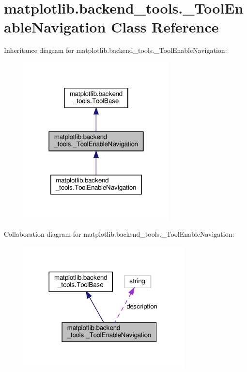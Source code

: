 \hypertarget{classmatplotlib_1_1backend__tools_1_1__ToolEnableNavigation}{}\section{matplotlib.\+backend\+\_\+tools.\+\_\+\+Tool\+Enable\+Navigation Class Reference}
\label{classmatplotlib_1_1backend__tools_1_1__ToolEnableNavigation}


Inheritance diagram for matplotlib.\+backend\+\_\+tools.\+\_\+\+Tool\+Enable\+Navigation\+:
\nopagebreak
\begin{figure}[H]
\begin{center}
\leavevmode
\includegraphics[width=226pt]{classmatplotlib_1_1backend__tools_1_1__ToolEnableNavigation__inherit__graph}
\end{center}
\end{figure}


Collaboration diagram for matplotlib.\+backend\+\_\+tools.\+\_\+\+Tool\+Enable\+Navigation\+:
\nopagebreak
\begin{figure}[H]
\begin{center}
\leavevmode
\includegraphics[width=248pt]{classmatplotlib_1_1backend__tools_1_1__ToolEnableNavigation__coll__graph}
\end{center}
\end{figure}
